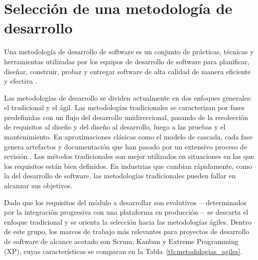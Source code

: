 \section{Selección de una metodología de desarrollo}

Una metodología de desarrollo de software es un conjunto de prácticas, técnicas y herramientas
utilizadas por los equipos de desarrollo de software para planificar, diseñar, construir, probar y
entregar software de alta calidad de manera eficiente y efectiva \citep{Pressman2021}.

Las metodologías de desarrollo se dividen actualmente en dos enfoques generales: el tradicional y
el ágil. Las metodologías tradicionales se caracterizan por fases predefinidas con un flujo del
desarrollo unidireccional, pasando de la recolección de requisitos al diseño y del diseño al
desarrollo, luego a las pruebas y el mantenimiento. En aproximaciones clásicas como el modelo de
cascada, cada fase genera artefactos y documentación que han pasado por un extensivo proceso de
revisión \citep{Sommerville2015}. Los métodos tradicionales son mejor utilizados en situaciones en
las que los requisitos están bien definidos. En industrias que cambian rápidamente, como la del
desarrollo de software, las metodologías tradicionales pueden fallar en alcanzar sus objetivos.

Dado que los requisitos del módulo a desarrollar son evolutivos ---determinados por la integración
progresiva con una plataforma en producción--- se descarta el enfoque tradicional y se orienta la
selección hacia las metodologías ágiles. Dentro de este grupo, los marcos de trabajo más relevantes
para proyectos de desarrollo de software de alcance acotado son Scrum, Kanban y Extreme Programming
(XP), cuyas características se comparan en la Tabla~\ref{tb:metodologias_agiles}.

